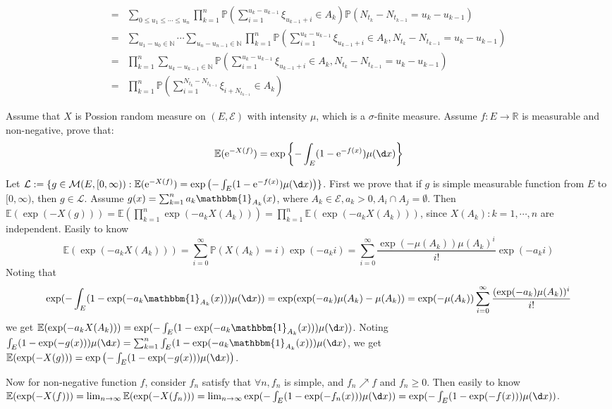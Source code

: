 \documentclass[../main]{subfiles}
\begin{document}
\begin{solution}
\begin{enumerate}
\begin{equation}
\begin{aligned}
          = & \sum_{0 \leq u_1\leq \cdots\leq u_n}\prod_{k=1}^{n} \mathbb{P}(\sum_{i= 1}^{u_k-u_{k-1}}\xi_{u_{k-1}+ i}  \in A_k)\mathbb{P}(N_{t_{k}}-N_{t_{k-1}}=u_k-u_{k-1})                         \\
          = & \sum_{u_1-u_{0} \in \mathbb{N}}\cdots \sum_{u_n-u_{n-1} \in \mathbb{N}}\prod_{k=1}^{n} \mathbb{P}(\sum_{i= 1}^{u_k-u_{k-1}}\xi_{u_{k-1}+ i}  \in A_k,N_{t_{k}}-N_{t_{k-1}}=u_k-u_{k-1}) \\
          = & \prod_{k=1}^{n} \sum_{u_k-u_{k-1} \in \mathbb{N}}\mathbb{P}(\sum_{i= 1}^{u_k-u_{k-1}}\xi_{u_{k-1}+ i}  \in A_k,N_{t_{k}}-N_{t_{k-1}}=u_k-u_{k-1})                                       \\
          = & \prod_{k=1}^n\mathbb{P}(\sum_{i=1}^{N_{t_k}-N_{t_{k-1}}}\xi_{i + N_{t_{k-1}}}  \in A_k)
        \end{aligned}
      \end{equation}
  \end{enumerate}
\end{solution}
\begin{problem}\label{pro:2}
  Assume that \(X\) is Possion random measure on \((E,\mathcal{E})\) with intensity \(\mu\), which is a \(\sigma\)-finite measure.
  Assume \(f:E \to \mathbb{R}\) is measurable and non-negative, prove that:
  \[
    \mathbb{E}(\mathrm{e}^{-X(f)})=\exp \left\{-\int_{E}(1-\mathrm{e}^{-f(x)}) \mu(\d x)\right\}
  \]
\end{problem}
\begin{solution}
  Let \(\mathcal{L}:=\{g \in \mathcal{M}(E,[0,\infty)): \mathbb{E}(\mathrm{e}^{-X(f)})=\exp\left(-\int_{E}(1-\mathrm{e}^{-f(x)}) \mu(\d x)\right) \}\).
  First we prove that if \(g\) is simple measurable function from \(E\) to \([0,\infty)\), then \(g \in \mathcal{L}\).
  Assume \(g(x)=\sum_{k=1}^{n} a_k\mathbbm{1}_{A_k}(x)\), where \(A_k \in \mathcal{E},a_k >0,A_i \cap A_j = \emptyset\).
  Then \(\mathbb{E}(\exp(-X(g)))=\mathbb{E}(\prod_{k=1}^{n} \exp(-a_k X(A_k)))=\prod_{k=1}^{n} \mathbb{E}(\exp(-a_k X(A_k)))\), since \(X(A_k):k=1,\cdots,n\) are independent.
  Easily to know
  \[
    \mathbb{E}(\exp(-a_k X(A_k)))=\sum_{i=0}^{\infty} \mathbb{P}(X(A_k)=i) \exp(-a_k i)=\sum_{i=0}^{\infty} \frac{\exp(-\mu(A_k))\mu(A_k)^i}{i!} \exp(-a_k i)
  \]
  Noting that
  \[
    \exp(-\int_{E}(1-\exp(-a_k\mathbbm{1}_{A_k}(x))) \mu(\d x))=\exp(\exp(-a_k) \mu(A_k) - \mu(A_k))=\exp(-\mu(A_k))\sum_{i=0}^{\infty} \frac{(\exp(-a_k) \mu(A_k))^i}{i!}
  \]
  we get \(\mathbb{E}(\exp(-a_k X(A_k)))=\exp(-\int_{E}(1-\exp(-a_k\mathbbm{1}_{A_k}(x))) \mu(\d x))\).
  Noting \(\int_{E}(1-\exp(-g(x))) \mu(\d x)=\sum_{k=1}^{n}\int_{E}(1-\exp(-a_k\mathbbm{1}_{A_k}(x))) \mu(\d x)\),
  we get \(\mathbb{E}(\exp(-X(g)))=\exp\left(-\int_{E}(1-\exp(-g(x))) \mu(\d x)\right)\).

  Now for non-negative function \(f\), consider \(f_n\) satisfy that \(\forall n,f_n\) is simple, and \(f_n \nearrow f \) and \(f_n \geq 0\).
  Then easily to know \(\mathbb{E}(\exp(-X(f)))=\lim_{n \to \infty}\mathbb{E}(\exp(-X(f_n)))=\lim_{n \to \infty}\exp(-\int_{E}(1-\exp(-f_n(x))) \mu(\d x))=\exp(-\int_{E}(1-\exp(-f(x))) \mu(\d x))\).
\end{solution}
\end{document}
